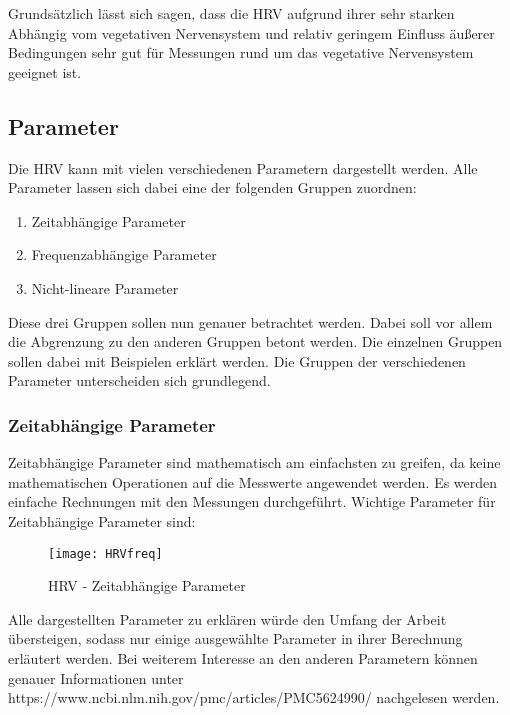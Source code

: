 Grundsätzlich lässt sich sagen, dass die HRV aufgrund ihrer sehr starken Abhängig vom vegetativen Nervensystem und relativ geringem Einfluss äußerer Bedingungen sehr gut für Messungen rund um das vegetative Nervensystem geeignet ist.
 
\color{black} 

 \subsection{Parameter}
 
 Die HRV kann mit vielen verschiedenen Parametern dargestellt werden. Alle Parameter lassen sich dabei eine der folgenden Gruppen zuordnen:
 
 \begin{enumerate}
 	\item Zeitabhängige Parameter
 	\item Frequenzabhängige Parameter
 	\item Nicht-lineare Parameter
\end{enumerate}

Diese drei Gruppen sollen nun genauer betrachtet werden. Dabei soll vor allem die Abgrenzung zu den anderen Gruppen betont werden.\color{red} Die einzelnen Gruppen sollen dabei mit Beispielen erklärt werden. \color{black}
Die Gruppen der verschiedenen Parameter unterscheiden sich grundlegend. 

\subsubsection{Zeitabhängige Parameter}	
Zeitabhängige Parameter sind mathematisch am einfachsten zu greifen, da keine mathematischen Operationen auf die Messwerte angewendet werden. Es werden einfache Rechnungen mit den Messungen durchgeführt. Wichtige Parameter für Zeitabhängige Parameter sind:   
 
 \begin{figure}[H]
 	\centering
 	\texttt{[image: HRVfreq]}
 	\caption{HRV - Zeitabhängige Parameter}
 	\label{fig:HRVfreq}
 \end{figure}
Alle dargestellten Parameter zu erklären würde den Umfang der Arbeit übersteigen, sodass nur einige ausgewählte Parameter in ihrer Berechnung erläutert werden. Bei weiterem Interesse an den anderen Parametern können genauer Informationen unter https://www.ncbi.nlm.nih.gov/pmc/articles/PMC5624990/ nachgelesen werden. 

